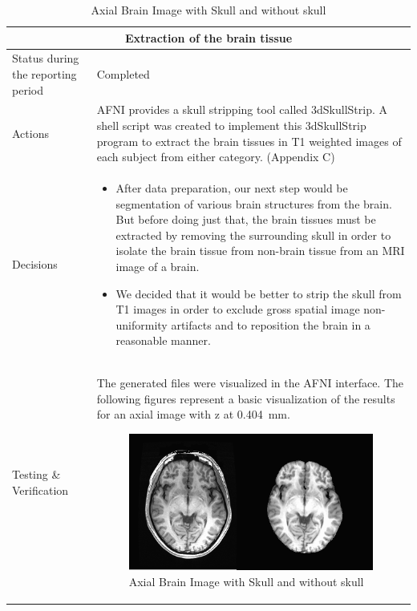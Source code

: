 \documentclass[12pt]{article}
\begin{document}
\begin{table}[H]
  \centering
  \begin{tabular} {| m{3.3cm} | m{11.5cm} | }
    \hline
    \multicolumn{2}{|c|}{Extraction of the brain tissue} \\ \hline
    Status during the reporting period   & Completed   \\ \hline
    Actions &
    AFNI provides a skull stripping tool called 3dSkullStrip. A shell
    script was created to implement this 3dSkullStrip program to
    extract the brain tissues in T1 weighted images of each subject
    from either category. (Appendix C) \\ \hline

    Decisions &
    \begin{itemize}

      \item After data preparation, our next step would be
        segmentation of various brain structures from the brain. But
        before doing just that, the brain tissues must be extracted by
        removing the surrounding skull in order to isolate the brain
        tissue from non-brain tissue from an MRI image of a brain.

      \item We decided that it would be better to strip the skull
        from T1 images in order to exclude gross spatial image
        non-uniformity artifacts and to reposition the brain in a
        reasonable manner.

    \end{itemize} \\ \hline

    Testing \& Verification &
    The generated files were visualized in the AFNI interface. The
    following figures represent a basic visualization of the results
    for an axial image with z at 0.404~mm.


    \begin{minipage}{.6\textwidth}
    \begin{figure}[H]
      \captionsetup{singlelinecheck = false, justification=justified}
      \includegraphics[width=\linewidth]{./.img/test.png}
      \caption{Axial Brain Image with Skull and without skull}%
      \label{fig:axial_brain_image_with_skull}
    \end{figure}
    \end{minipage}


\end{tabular}
\end{table}
\end{document}
